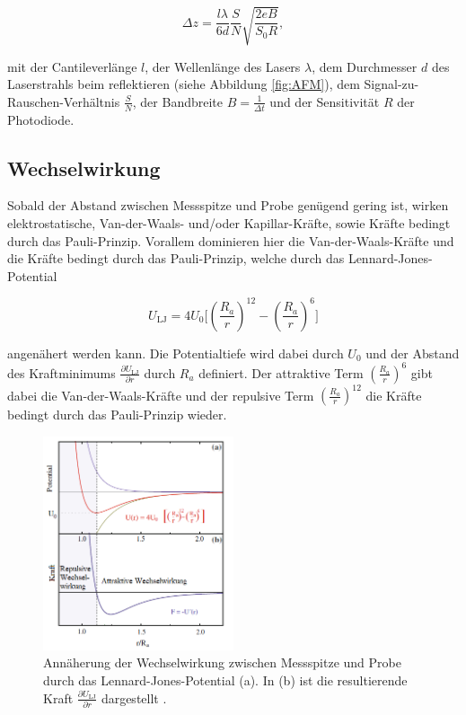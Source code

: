\begin{equation}
  \Delta z = \frac{l \lambda}{6 d} \frac{S}{N} \sqrt{\frac{2eB}{S_0 R}},
  \label{eq:F3}
\end{equation}

\noindent
mit der Cantileverlänge $l$, der Wellenlänge des Lasers $\lambda$, dem Durchmesser
$d$ des Laserstrahls beim reflektieren (siehe Abbildung \ref{fig:AFM}),
dem Signal-zu-Rauschen-Verhältnis $\frac{S}{N}$, der Bandbreite
$B=\frac{1}{\Delta t}$ und der Sensitivität $R$ der Photodiode.

\subsection{Wechselwirkung}
\label{sec:Wechselwirkung}

Sobald der Abstand zwischen Messspitze und Probe genügend gering ist, wirken
elektrostatische, Van-der-Waals- und/oder Kapillar-Kräfte, sowie Kräfte bedingt
durch das Pauli-Prinzip. Vorallem dominieren hier die Van-der-Waals-Kräfte und die
Kräfte bedingt durch das Pauli-Prinzip, welche durch das Lennard-Jones-Potential

\begin{equation}
	U_{\text{LJ}} = 4U_0 \biggl[
		\left(\frac{R_a}{r}\right)^{12} - \left(\frac{R_a}{r}\right)^6
	\biggr]
	\label{eg:F4}
\end{equation}

\noindent
angenähert werden kann. Die Potentialtiefe wird dabei durch $U_0$
und der Abstand des Kraftminimums $\frac{\partial U_{\text{LJ}}}{\partial r}$
durch $R_a$ definiert. Der attraktive Term $\left(\frac{R_a}{r}\right)^6$
gibt dabei die Van-der-Waals-Kräfte und der repulsive Term
$\left(\frac{R_a}{r}\right)^{12}$ die Kräfte bedingt durch das Pauli-Prinzip
wieder.

\begin{figure}[H]
	\centering
	\includegraphics[width=0.5\textwidth]{Abb/LJ.png}
	\caption{Annäherung der Wechselwirkung zwischen Messspitze und Probe durch
	das Lennard-Jones-Potential (a). In (b) ist die resultierende Kraft
	$\frac{\partial U_{\text{LJ}}}{\partial r}$ dargestellt \cite[148]{AFM}.}
	\label{fig:LJ}
\end{figure}

